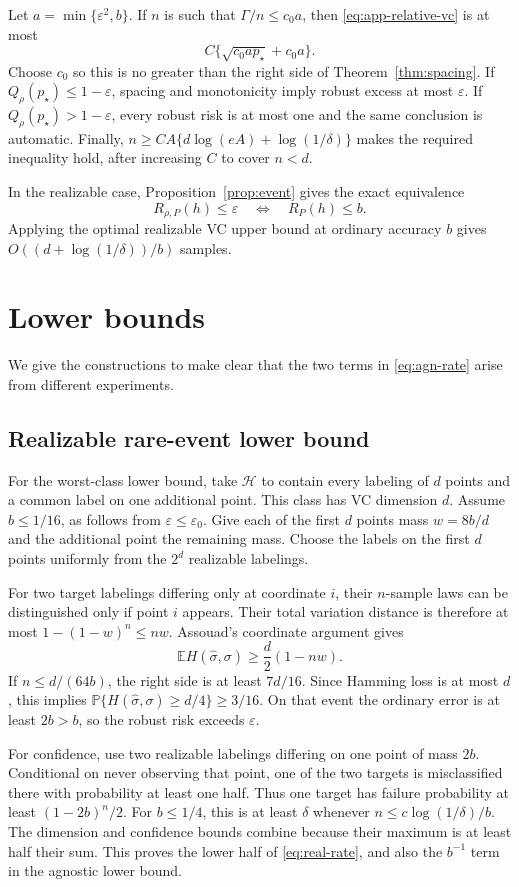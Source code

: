 \documentclass{article}
\theoremstyle{remark}
\newcommand{\E}{\mathbb E}
\newcommand{\Pp}{\mathbb P}
\newcommand{\cH}{\mathcal H}
\newcommand{\eps}{\varepsilon}
\begin{document}
Let $a=\min\{\eps^2,b\}$.  If $n$ is such that $\Gamma/n\le c_0a$, then \eqref{eq:app-relative-vc} is at most \[ C\{\sqrt{c_0ap_\star}+c_0a\}. \] Choose $c_0$ so this is no greater than the right side of Theorem~\ref{thm:spacing}.  If $Q_\rho(p_\star)\le1-\eps$, spacing and monotonicity imply robust excess at most $\eps$.  If $Q_\rho(p_\star)>1-\eps$, every robust risk is at most one and the same conclusion is automatic.  Finally, $n\ge CA\{d\log(eA)+\log(1/\delta)\}$ makes the required inequality hold, after increasing $C$ to cover $n<d$.

In the realizable case, Proposition~\ref{prop:event} gives the exact equivalence \[ R_{\rho,P}(h)\le\eps\quad\Longleftrightarrow\quad R_P(h)\le b. \] Applying the optimal realizable VC upper bound at ordinary accuracy $b$ gives $O((d+\log(1/\delta))/b)$ samples.

\section{Lower bounds}
\label{app:lower}

We give the constructions to make clear that the two terms in \eqref{eq:agn-rate} arise from different experiments.

\subsection{Realizable rare-event lower bound}

For the worst-class lower bound, take $\cH$ to contain every labeling of $d$ points and a common label on one additional point.  This class has VC dimension $d$.  Assume $b\le1/16$, as follows from $\eps\le\eps_0$.  Give each of the first $d$ points mass $w=8b/d$ and the additional point the remaining mass.  Choose the labels on the first $d$ points uniformly from the $2^d$ realizable labelings.

For two target labelings differing only at coordinate $i$, their $n$-sample laws can be distinguished only if point $i$ appears.  Their total variation distance is therefore at most $1-(1-w)^n\le nw$.  Assouad's coordinate argument gives \[ \E H(\widehat\sigma,\sigma) \ge\frac d2(1-nw). \] If $n\le d/(64b)$, the right side is at least $7d/16$.  Since Hamming loss is at most $d$, this implies $\Pp\{H(\widehat\sigma,\sigma)\ge d/4\}\ge3/16$.  On that event the ordinary error is at least $2b>b$, so the robust risk exceeds $\eps$.

For confidence, use two realizable labelings differing on one point of mass $2b$.  Conditional on never observing that point, one of the two targets is misclassified there with probability at least one half.  Thus one target has failure probability at least $(1-2b)^n/2$.  For $b\le1/4$, this is at least $\delta$ whenever $n\le c\log(1/\delta)/b$.  The dimension and confidence bounds combine because their maximum is at least half their sum.  This proves the lower half of \eqref{eq:real-rate}, and also the $b^{-1}$ term in the agnostic lower bound.
\end{document}

